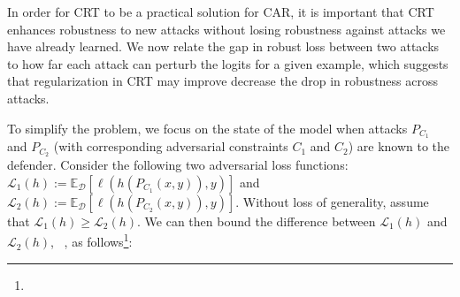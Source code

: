 In order for CRT to be a practical solution for CAR, it is important that CRT enhances robustness to new attacks without losing robustness against attacks we have already learned. 
We now relate the gap in robust loss between two attacks to how far each attack can perturb the logits for a given example,
which suggests that regularization in CRT may improve decrease the drop in robustness across attacks. 

To simplify the problem, we focus on the state of the model when attacks $P_{C_1}$ and $P_{C_2}$ (with corresponding adversarial constraints $C_1$ and $C_2$) are known to the defender. %
Consider the following two adversarial loss functions:
$\mathcal{L}_1(h) := \mathbb{E}_{\mathcal{D}}\left[\ell(h(P_{C_1}(x,y)),y)\right]$
and
$\mathcal{L}_2(h) := \mathbb{E}_{\mathcal{D}}\left[\ell(h(P_{C_2}(x,y)),y)\right].$
Without loss of generality, assume that $\mathcal{L}_1(h)
\geq \mathcal{L}_2(h)$. We can then bound the difference between $\mathcal{L}_1(h)$ and $\mathcal{L}_2(h)$, ~\citet{nern2023transfer}, as follows\footnote{}:
\vspace{-3pt}

